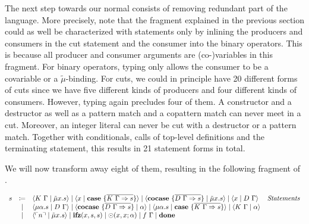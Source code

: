 The next step towards our normal consists of removing redundant part of the language.
More precisely, note that the fragment \targetvar{} explained in the previous section could as well be characterized with statements only by inlining the producers and consumers in the cut statement and the consumer into the binary operators.
This is because all producer and consumer arguments are (co-)variables in this fragment.
For binary operators, typing only allows the consumer to be a covariable or a $\tilde\mu$-binding.
For cuts, we could in principle have 20 different forms of cuts since we have five different kinds of producers and four different kinds of consumers.
However, typing again precludes four of them.
A constructor and a destructor as well as a pattern match and a copattern match can never meet in a cut.
Moreover, an integer literal can never be cut with a destructor or a pattern match.
Together with conditionals, calls of top-level definitions and the terminating statement, this results in 21 statement forms in total.

We will now transform away eight of them, resulting in the following fragment \targetred{} of \targetlang{}.

\begin{definition}
  \[
    \begin{array}{rcll}
      s & \coloneqq & \langle K\ \Gamma \mid \tilde{\mu}x.s \rangle \mid \langle x \mid \mathbf{case}\ \{ \overline{K\ \Gamma \Rightarrow s} \} \rangle \mid \langle \mathbf{cocase}\ \{ \overline{D\ \Gamma \Rightarrow s} \} \mid \tilde{\mu}x.s \rangle \mid \langle x \mid D\ \Gamma \rangle & \emph{Statements}\\
       & \mid & \langle \mu\alpha.s \mid D\ \Gamma \rangle \mid \langle \mathbf{cocase}\ \{ \overline{D\ \Gamma \Rightarrow s} \} \mid \alpha \rangle \mid \langle \mu\alpha.s \mid \mathbf{case}\ \{ \overline{K\ \Gamma \Rightarrow s} \} \rangle \mid \langle K\ \Gamma \mid \alpha \rangle & \\
       & \mid & \langle \ulcorner n \urcorner \mid \tilde{\mu}x.s \rangle \mid \mathbf{ifz}(x, s, s) \mid \odot(x, x; \alpha) \mid f\ \Gamma \mid \mathbf{done} & \\
    \end{array}
  \]
\end{definition}

